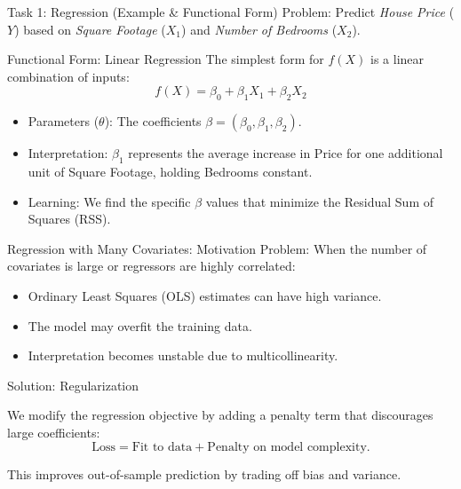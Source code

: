 \documentclass[aspectratio=169]{beamer}
\newcommand{\1}{\mathbf{1}}
\begin{document}
\begin{frame}{Task 1: Regression (Example \& Functional Form)}
    Problem: Predict \textit{House Price} ($Y$) based on \textit{Square Footage} ($X_1$) and \textit{Number of Bedrooms} ($X_2$).
    
    \vspace{1em}
    Functional Form: Linear Regression
    The simplest form for $f(X)$ is a linear combination of inputs:
    $$ f(X) = \beta_0 + \beta_1 X_1 + \beta_2 X_2 $$
    
    \begin{itemize}
        \item Parameters ($\theta$): The coefficients $\beta = (\beta_0, \beta_1, \beta_2)$.
        \item Interpretation: $\beta_1$ represents the average increase in Price for one additional unit of Square Footage, holding Bedrooms constant.
        \item Learning: We find the specific $\beta$ values that minimize the Residual Sum of Squares (RSS).
    \end{itemize}
\end{frame}


\begin{frame}{Regression with Many Covariates: Motivation}
    Problem:
    When the number of covariates is large or regressors are highly correlated:
    \begin{itemize}
        \item Ordinary Least Squares (OLS) estimates can have high variance.
        \item The model may overfit the training data.
        \item Interpretation becomes unstable due to multicollinearity.
    \end{itemize}

    \vspace{0.8em}
    Solution: Regularization

    We modify the regression objective by adding a penalty term that discourages large coefficients:
    \[
    \text{Loss} = \text{Fit to data} + \text{Penalty on model complexity}.
    \]

    This improves out-of-sample prediction by trading off bias and variance.
\end{frame}
\end{document}
